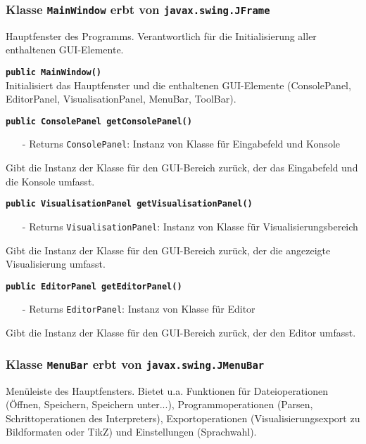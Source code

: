 \documentclass[parskip=full,11pt,twoside]{scrartcl}
\begin{document}
\subsubsection{Klasse \texttt{MainWindow} erbt von \texttt{javax.swing.JFrame}}

Hauptfenster des Programms. Verantwortlich für die Initialisierung aller enthaltenen GUI-Elemente.

\textbf{\texttt{public MainWindow()}}\\
Initialisiert das Hauptfenster und die enthaltenen GUI-Elemente (ConsolePanel, EditorPanel, VisualisationPanel, MenuBar, ToolBar).

\textbf{\texttt{public ConsolePanel getConsolePanel()}}\\
\begin{itemize}[noitemsep]
	\item[-] Returns \texttt{ConsolePanel}: Instanz von Klasse für Eingabefeld und Konsole
\end{itemize}
Gibt die Instanz der Klasse für den GUI-Bereich zurück, der das Eingabefeld und die Konsole umfasst.

\textbf{\texttt{public VisualisationPanel getVisualisationPanel()}}\\
\begin{itemize}[noitemsep]
	\item[-] Returns \texttt{VisualisationPanel}: Instanz von Klasse für Visualisierungsbereich
\end{itemize}
Gibt die Instanz der Klasse für den GUI-Bereich zurück, der die angezeigte Visualisierung umfasst.

\textbf{\texttt{public EditorPanel getEditorPanel()}}\\
\begin{itemize}[noitemsep]
	\item[-] Returns \texttt{EditorPanel}: Instanz von Klasse für Editor
\end{itemize}
Gibt die Instanz der Klasse für den GUI-Bereich zurück, der den Editor umfasst.

\subsubsection{Klasse \texttt{MenuBar} erbt von \texttt{javax.swing.JMenuBar}}

Menüleiste des Hauptfensters. Bietet u.a. Funktionen für Dateioperationen (Öffnen, Speichern, Speichern unter...), Programmoperationen (Parsen, Schrittoperationen des Interpreters), Exportoperationen (Visualisierungsexport zu Bildformaten oder TikZ) und Einstellungen (Sprachwahl).
\end{document}
